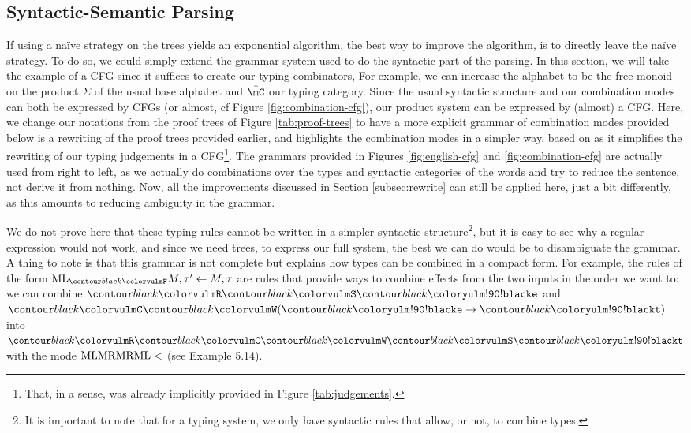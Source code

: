 \subsection{Syntactic-Semantic Parsing}
\label{subsec:ssparsing}
If using a naïve strategy on the trees yields an exponential algorithm,
the best way to improve the algorithm, is to directly leave the naïve strategy.
To do so, we could simply extend the grammar system used to do the syntactic
part of the parsing.
In this section, we will take the example of a CFG since it suffices to create
our typing combinators,
For example, we can increase the alphabet to be the free monoid on the product
$\Sigma$ of the usual base alphabet and $\bar{\mC}$ our typing category.
Since the usual syntactic structure and our combination modes can both be
expressed by CFGs (or almost, cf Figure \ref{fig:combination-cfg}), our product
system can be expressed by (almost) a CFG.
Here, we change our notations from the proof trees of Figure
\ref{tab:proof-trees} to have a more explicit grammar of combination modes
provided below is a rewriting of the proof trees provided earlier, and
highlights the combination modes in a simpler way, based on
\cite{bumfordEffectdrivenInterpretationFunctors2025} as it simplifies the
rewriting of our typing judgements in a CFG\footnote{That, in a sense, was
	already implicitly provided in Figure \ref{tab:judgements}.}.
The grammars provided  in Figures \ref{fig:english-cfg} and \ref{fig:combination-cfg}
are actually used from right to left, as we actually do combinations over the
types and syntactic categories of the words and try to reduce the sentence, not
derive it from nothing.
Now, all the improvements discussed in Section \ref{subsec:rewrite}
can still be applied here, just a bit differently, as this amounts to reducing
ambiguity in the grammar.

\begin{figure*}
	\centering
	
	\caption{Possible Type Combinations in the form of a near CFG}
	\label{fig:combination-cfg}
\end{figure*}

We do not prove here that these typing rules cannot be written in a simpler
syntactic structure\footnote{It is important to note that for a typing system,
	we only have syntactic rules that allow, or not, to combine types.}, but it is
easy to see why a regular expression would not work, and since we need trees,
to express our full system, the best we can do would be to disambiguate the
grammar.
A thing to note is that this grammar is not complete but explains how types can
be combined in a compact form.
For example, the rules of the form $\combML_{\f{F}} M, \tau' \gets M, \tau$ are
rules that provide ways to combine effects from the two inputs in the order we
want to: we can combine $\f{R}\f{S}\e$ and $\f{C}\f{W}(\e \to \t)$ into
$\f{R}\f{C}\f{W}\f{S}\t$ with the mode $\text{ML}\text{MR}\text{MR}\text{ML} <$ (see
\cite{bumfordEffectdrivenInterpretationFunctors2025} Example 5.14).


